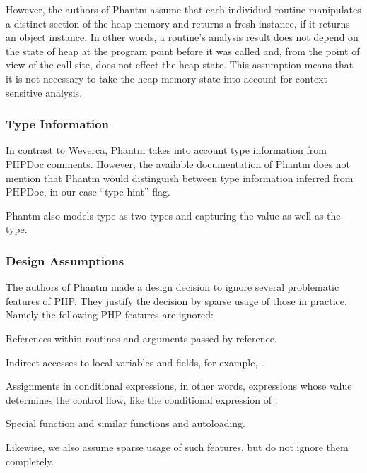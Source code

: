     However, the authors of Phantm assume that each individual routine 
    manipulates a distinct section of the heap memory and returns a 
    fresh instance, if it returns an object instance. In other words, 
    a routine's analysis result does not depend on the state of heap at 
    the program point before it was called and, from the point of view 
    of the call site, does not effect the heap state. This assumption 
    means that it is not necessary to take the heap memory state into 
    account for context sensitive analysis.
    
    \subsubsection*{Type Information}
    
    In contrast to Weverca, Phantm takes into account type 
    information from PHPDoc comments. However, the available 
    documentation of Phantm does not mention that Phantm would 
    distinguish between type information inferred from 
    PHPDoc, in our case ``type hint'' flag.
    
    Phantm also models  type as two types 
     and  capturing the value as well 
    as the type.
    
    \subsubsection*{Design Assumptions}
    The authors of Phantm made a design decision to ignore 
    several problematic features of PHP. They justify the 
    decision by sparse usage of those in practice. 
    Namely the following PHP features are ignored:
    \begin{itemize*}
        \item References within routines and arguments passed by reference.
        \item Indirect accesses to local variables and fields, for example, .
        \item Assignments in conditional expressions, in other words, expressions 
            whose value determines the control flow, like the conditional expression 
            of .
        \item Special function  and similar functions and autoloading.
    \end{itemize*}
        
    Likewise, we also assume sparse usage of such features, 
    but do not ignore them completely.
    
